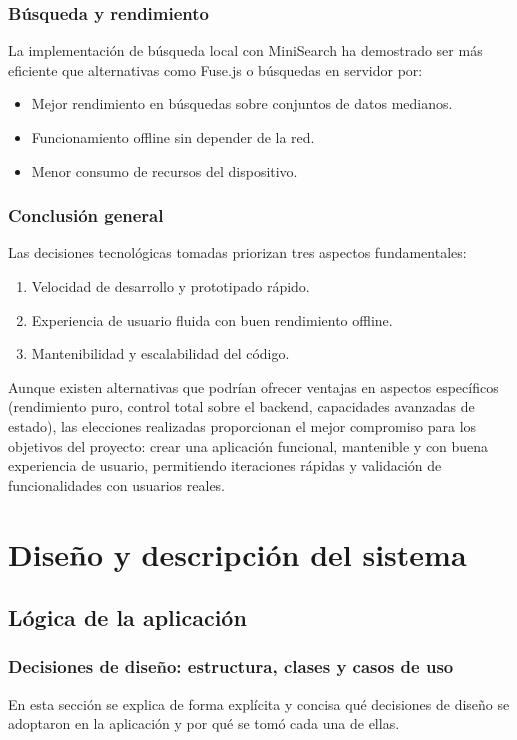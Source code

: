 \documentclass[twoside, openright, 11pt]{report}
\begin{document}
	\subsection*{Búsqueda y rendimiento}
	La implementación de búsqueda local con MiniSearch ha demostrado ser más eficiente que alternativas como Fuse.js o búsquedas en servidor por:
	\begin{itemize}
		\item Mejor rendimiento en búsquedas sobre conjuntos de datos medianos.
		\item Funcionamiento offline sin depender de la red.
		\item Menor consumo de recursos del dispositivo.
	\end{itemize}
	
	\subsection*{Conclusión general}
	Las decisiones tecnológicas tomadas priorizan tres aspectos fundamentales:
	\begin{enumerate}
		\item Velocidad de desarrollo y prototipado rápido.
		\item Experiencia de usuario fluida con buen rendimiento offline.
		\item Mantenibilidad y escalabilidad del código.
	\end{enumerate}
	
	Aunque existen alternativas que podrían ofrecer ventajas en aspectos específicos (rendimiento puro, control total sobre el backend, capacidades avanzadas de estado), las elecciones realizadas proporcionan el mejor compromiso para los objetivos del proyecto: crear una aplicación funcional, mantenible y con buena experiencia de usuario, permitiendo iteraciones rápidas y validación de funcionalidades con usuarios reales.

\chapter{Diseño y descripción del sistema}\label{cap.diseno y descripcion del sistema} %
	\section{Lógica de la aplicación}
		\subsection{Decisiones de diseño: estructura, clases y casos de uso}
			En esta sección se explica de forma explícita y concisa qué decisiones de diseño se adoptaron en la aplicación y por qué se tomó cada una de ellas.
		
\end{document}
